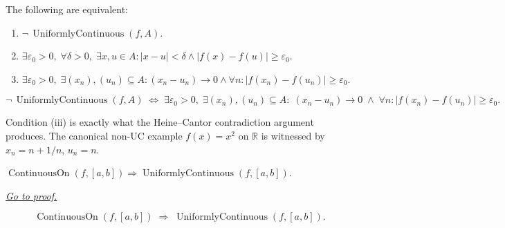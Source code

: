 
\begin{proposition}
\label{prop:non-uniform-continuity-criteria}
The following are equivalent:
\begin{enumerate}[label=(\roman*)]
  \item $\neg\,\operatorname{UniformlyContinuous}(f,A)$.
  \item $\exists\varepsilon_0>0,\;\forall\delta>0,\;\exists x,u\in A:
    |x-u|<\delta\wedge|f(x)-f(u)|\geq\varepsilon_0$.
  \item $\exists\varepsilon_0>0,\;\exists(x_n),(u_n)\subseteq A:
    (x_n-u_n)\to 0\wedge\forall n:|f(x_n)-f(u_n)|\geq\varepsilon_0$.
\end{enumerate}
\end{proposition}

\begin{remark*}
\[
  \neg\,\operatorname{UniformlyContinuous}(f,A)
  \;\iff\;
  \exists\varepsilon_0>0,\;\exists(x_n),(u_n)\subseteq A:\;
  (x_n-u_n)\to 0
  \;\wedge\;
  \forall n:|f(x_n)-f(u_n)|\geq\varepsilon_0.
\]
\end{remark*}

\begin{remark*}[Interpretation]
Condition (iii) is exactly what the Heine--Cantor contradiction argument
produces. The canonical non-UC example $f(x)=x^2$ on $\mathbb{R}$ is
witnessed by $x_n=n+1/n$, $u_n=n$.
\end{remark*}


\begin{theorem}
\label{thm:heine-cantor}
$\operatorname{ContinuousOn}(f,[a,b])
\Rightarrow\operatorname{UniformlyContinuous}(f,[a,b])$.

\smallskip\noindent
\hyperref[prf:heine-cantor]{\textit{Go to proof.}}
\end{theorem}

\begin{remark*}
\[
  \operatorname{ContinuousOn}(f,[a,b])
  \;\Rightarrow\;
  \operatorname{UniformlyContinuous}(f,[a,b]).
\]
\end{remark*}

